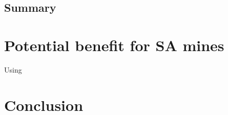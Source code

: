 	\subsection{Summary}
\newpage
\section{Potential benefit for SA mines}

	Using  
\section{Conclusion}